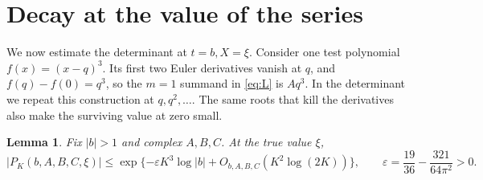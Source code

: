 \documentclass[11pt]{article}
\newtheorem{lemma}[theorem]{Lemma}
\newcommand{\ep}{\varepsilon}
\begin{document}
\section{Decay at the value of the series}\label{sec:decay}

We now estimate the determinant at \(t=b,X=\xi\). Consider one
test polynomial \(f(x)=(x-q)^3\). Its first two Euler derivatives
vanish at \(q\), and \(f(q)-f(0)=q^3\), so the \(m=1\) summand
in \eqref{eq:L} is \(Aq^3\). In the determinant we repeat this
construction at \(q,q^2,\ldots\). The same roots that kill the
derivatives also make the surviving value at zero small.

\begin{lemma}\label{lem:decay}
Fix \(|b|>1\) and complex \(A,B,C\). At the true value \(\xi\),
\[
 |P_K(b,A,B,C,\xi)|\le
 \exp\{-\ep K^3\log |b|+O_{b,A,B,C}(K^2\log(2K))\},
 \qquad \ep=\frac{19}{36}-\frac{321}{64\pi^2}>0 .
\]
\end{lemma}
\end{document}
